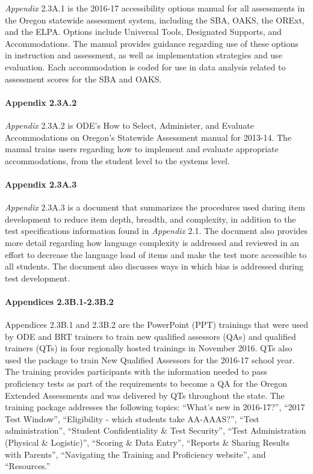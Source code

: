\documentclass[]{article}
\let\oldparagraph\paragraph
\renewcommand{\paragraph}[1]{\oldparagraph{#1}\mbox{}}
\begin{document}
\emph{Appendix} 2.3A.1 is the 2016-17 accessibility options manual for
all assessments in the Oregon statewide assessment system, including the
SBA, OAKS, the ORExt, and the ELPA. Options include Universal Tools,
Designated Supports, and Accommodations. The manual provides guidance
regarding use of these options in instruction and assessment, as well as
implementation strategies and use evaluation. Each accommodation is
coded for use in data analysis related to assessment scores for the SBA
and OAKS.

\paragraph{Appendix 2.3A.2}\label{appendix-2.3a.2}

\emph{Appendix} 2.3A.2 is ODE's How to Select, Administer, and Evaluate
Accommodations on Oregon's Statewide Assessment manual for 2013-14. The
manual trains users regarding how to implement and evaluate appropriate
accommodations, from the student level to the systems level.

\paragraph{Appendix 2.3A.3}\label{appendix-2.3a.3}

\emph{Appendix} 2.3A.3 is a document that summarizes the procedures used
during item development to reduce item depth, breadth, and complexity,
in addition to the test specifications information found in
\emph{Appendix} 2.1. The document also provides more detail regarding
how language complexity is addressed and reviewed in an effort to
decrease the language load of items and make the test more accessible to
all students. The document also discusses ways in which bias is
addressed during test development.

\paragraph{Appendices 2.3B.1-2.3B.2}\label{appendices-2.3b.1-2.3b.2}

Appendices 2.3B.1 and 2.3B.2 are the PowerPoint (PPT) trainings that
were used by ODE and BRT trainers to train new qualified assessors (QAs)
and qualified trainers (QTs) in four regionally hosted trainings in
November 2016. QTs also used the package to train New Qualified
Assessors for the 2016-17 school year. The training provides
participants with the information needed to pass proficiency tests as
part of the requirements to become a QA for the Oregon Extended
Assessments and was delivered by QTs throughout the state. The training
package addresses the following topics: ``What's new in 2016-17?'',
``2017 Test Window'', ``Eligibility - which students take AA-AAAS?'',
``Test administration'', ``Student Confidentiality \& Test Security'',
``Test Administration (Physical \& Logistic)'', ``Scoring \& Data
Entry'', ``Reports \& Sharing Results with Parents'', ``Navigating the
Training and Proficiency website'', and ``Resources.''
\end{document}
